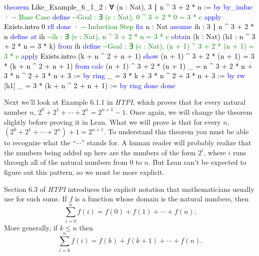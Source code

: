 \documentclass[
  letterpaper,
  DIV=11,
  numbers=noendperiod]{scrreprt}
\newenvironment{Shaded}{\begin{snugshade}}{\end{snugshade}}
\newcommand{\CommentTok}[1]{\textcolor[rgb]{0.37,0.37,0.37}{#1}}
\newcommand{\KeywordTok}[1]{\textcolor[rgb]{0.00,0.23,0.31}{#1}}
\newcommand{\NormalTok}[1]{\textcolor[rgb]{0.00,0.23,0.31}{#1}}
\renewcommand{\NormalTok}[1]{\textcolor[HTML]{000000}{#1}}
\renewcommand{\KeywordTok}[1]{\textcolor[HTML]{0000FF}{#1}}
\renewcommand{\CommentTok}[1]{\textcolor[HTML]{008000}{#1}}
\theoremstyle{remark}
\begin{document}
\begin{Shaded}
\begin{Highlighting}[]
\KeywordTok{theorem}\NormalTok{ Like\_Example\_6\_1\_2 :}
\NormalTok{    ∀ (n : Nat), 3 ∣ n \^{} 3 + 2 * n := }\KeywordTok{by}
  \KeywordTok{by\_induc}
\NormalTok{  · }\CommentTok{{-}{-} Base Case}
    \KeywordTok{define}         \CommentTok{{-}{-}Goal : ∃ (c : Nat), 0 \^{} 3 + 2 * 0 = 3 * c}
    \KeywordTok{apply}\NormalTok{ Exists.intro 0}
    \KeywordTok{rfl}
    \KeywordTok{done}
\NormalTok{  · }\CommentTok{{-}{-} Induction Step}
    \KeywordTok{fix}\NormalTok{ n : Nat}
    \KeywordTok{assume}\NormalTok{ ih : 3 ∣ n \^{} 3 + 2 * n}
    \KeywordTok{define} \KeywordTok{at}\NormalTok{ ih   }\CommentTok{{-}{-}ih : ∃ (c : Nat), n \^{} 3 + 2 * n = 3 * c}
    \KeywordTok{obtain}\NormalTok{ (k : Nat) (h1 : n \^{} 3 + 2 * n = 3 * k) }\KeywordTok{from}\NormalTok{ ih}
    \KeywordTok{define}         \CommentTok{{-}{-}Goal : ∃ (c : Nat), (n + 1) \^{} 3 + 2 * (n + 1) = 3 * c}
    \KeywordTok{apply}\NormalTok{ Exists.intro (k + n \^{} 2 + n + 1)}
    \KeywordTok{show}\NormalTok{ (n + 1) \^{} 3 + 2 * (n + 1) = 3 * (k + n \^{} 2 + n + 1) }\KeywordTok{from}
      \KeywordTok{calc}\NormalTok{ (n + 1) \^{} 3 + 2 * (n + 1)}
\NormalTok{        \_ = n \^{} 3 + 2 * n + 3 * n \^{} 2 + 3 * n + 3 := }\KeywordTok{by} \KeywordTok{ring}
\NormalTok{        \_ = 3 * k + 3 * n \^{} 2 + 3 * n + 3 := }\KeywordTok{by} \KeywordTok{rw}\NormalTok{ [h1]}
\NormalTok{        \_ = 3 * (k + n \^{} 2 + n + 1) := }\KeywordTok{by} \KeywordTok{ring}
    \KeywordTok{done}
  \KeywordTok{done}
\end{Highlighting}
\end{Shaded}

Next we'll look at Example 6.1.1 in \emph{HTPI}, which proves that for
every natural number \(n\), \(2^0 + 2^1 + \cdots + 2^n = 2^{n+1} - 1\).
Once again, we will change the theorem slightly before proving it in
Lean. What we will prove is that for every \(n\),
\((2^0 + 2^1 + \cdots + 2^n) + 1 = 2^{n+1}\). To understand this theorem
you must be able to recognize what the ``\(\cdots\)'' stands for. A
human reader will probably realize that the numbers being added up here
are the numbers of the form \(2^i\), where \(i\) runs through all of the
natural numbers from 0 to \(n\). But Lean can't be expected to figure
out this pattern, so we must be more explicit.

Section 6.3 of \emph{HTPI} introduces the explicit notation that
mathematicians usually use for such sums. If \(f\) is a function whose
domain is the natural numbers, then \[
\sum_{i=0}^n f(i) = f(0) + f(1) + \cdots + f(n).
\] More generally, if \(k \le n\) then \[
\sum_{i=k}^n f(i) = f(k) + f(k+1) + \cdots + f(n).
\]
\end{document}
